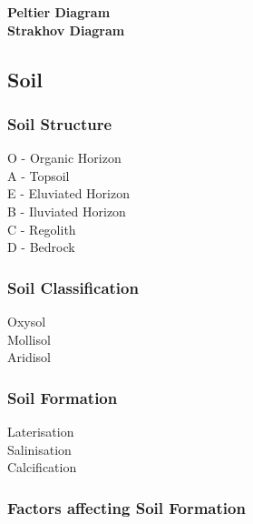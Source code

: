 \documentclass[../../main]{subfiles}
\begin{document}
	\noindent \textbf{Peltier Diagram} \\

	\noindent \textbf{Strakhov Diagram} \\

\subsection{Soil}

	\subsubsection{Soil Structure}	

	\begin{description}
		\item[O - Organic Horizon]
		\item[A - Topsoil]
		\item[E - Eluviated Horizon]
		\item[B - Iluviated Horizon]
		\item[C - Regolith]
		\item[D - Bedrock]
	\end{description}

	\subsubsection{Soil Classification}

	\begin{description}
		\item[Oxysol]
		\item[Mollisol]
		\item[Aridisol]
	\end{description}

	\subsubsection{Soil Formation}

	\begin{description}
		\item[Laterisation]
		\item[Salinisation]
		\item[Calcification]
	\end{description}

	\subsubsection{Factors affecting Soil Formation}
\end{document}
